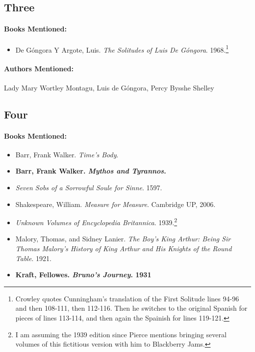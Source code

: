 \documentclass[12pt]{article}
\providecommand{\tightlist}{%
  \setlength{\itemsep}{0pt}\setlength{\parskip}{0pt}}
\begin{document}
\subsection{Three}\label{three}

\paragraph{Books Mentioned:}\label{books-mentioned-4}

\begin{itemize}
\tightlist
\item
  De Góngora Y Argote, Luis. \emph{The Solitudes of Luis De Góngora}. 1968.\footnote{Crowley quotes Cunningham's translation of the First Solitude lines 94-96 and then 108-111, then 112-116. Then he switches to the original Spanish for pieces of lines 113-114, and then again the Spainish for lines 119-121.}
\end{itemize}

\paragraph{Authors Mentioned:}\label{authors-mentioned-2}

Lady Mary Wortley Montagu, Luis de Góngora, Percy Bysshe Shelley

\subsection{Four}\label{four}

\paragraph{Books Mentioned:}\label{books-mentioned-5}

\begin{itemize}
\tightlist
\item
  Barr, Frank Walker. \emph{Time's Body}.
\item
  \textbf{Barr, Frank Walker. \emph{Mythos and Tyrannos}.}
\item
  \emph{Seven Sobs of a Sorrowful Soule for Sinne}. 1597.
\item
  Shakespeare, William. \emph{Measure for Measure}. Cambridge UP, 2006.
\item
  \emph{Unknown Volumes of Encyclopedia Britannica}. 1939.\footnote{I am assuming the 1939 edition since Pierce mentions bringing several volumes of this fictitious version with him to Blackberry Jams.}
\item
  Malory, Thomas, and Sidney Lanier. \emph{The Boy's King Arthur: Being Sir Thomas Malory's History of King Arthur and His Knights of the Round Table}. 1921.
\item
  \textbf{Kraft, Fellowes. \emph{Bruno's Journey}. 1931}
\end{itemize}
\end{document}

